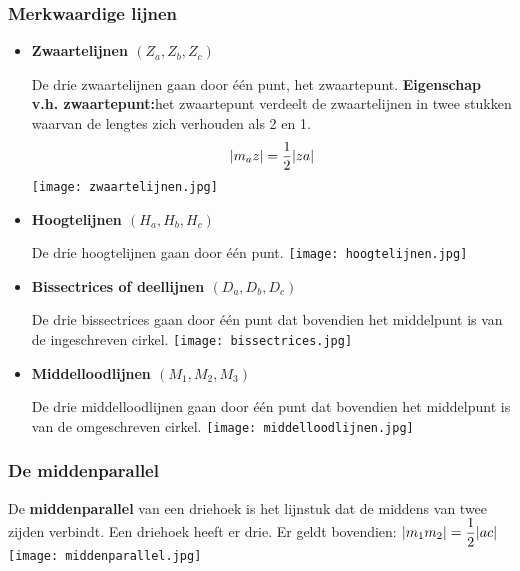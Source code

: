\subsubsection{Merkwaardige lijnen} \label{merkwaardige_lijnen}
\hypertarget{merkwaardige_lijnen}{}
		\begin{itemize}%
		\item \hypertarget{zwaartelijn}{{\bf Zwaartelijnen $(Z_a, Z_b, Z_c)$}}\label{zwaartelijn}\newline
		De drie zwaartelijnen gaan door \'e\'en punt, het zwaartepunt.\newline\newline
		{\bf Eigenschap v.h. zwaartepunt:}het zwaartepunt verdeelt de zwaartelijnen in twee 		stukken waarvan de lengtes zich verhouden als 2 en 1.
		\[|m_az|=\displaystyle\frac{\displaystyle 1}{\displaystyle 2}|za|\]
                \texttt{[image: zwaartelijnen.jpg]}
		\item \hypertarget{hoogtelijn}{{\bf Hoogtelijnen $(H_a, H_b, H_c)$}}\label{hoogtelijn}\newline
		De drie hoogtelijnen gaan door \'e\'en punt.\newline
                \texttt{[image: hoogtelijnen.jpg]}
		\item \hypertarget{bissectrice}{{\bf Bissectrices of deellijnen $(D_a, D_b, D_c)$}}\label{bissectrice}\newline
		De drie bissectrices gaan door \'e\'en punt dat bovendien het middelpunt is van de 		ingeschreven cirkel.\newline
                \texttt{[image: bissectrices.jpg]}
		\item \hypertarget{middelloodlijn}{{\bf Middelloodlijnen $(M_1, M_2, M_3)$}}\label{middelloodlijn}\newline
		De drie middelloodlijnen gaan door \'e\'en punt dat bovendien het middelpunt is van 		de omgeschreven cirkel.\newline
                \texttt{[image: middelloodlijnen.jpg]}
		\end{itemize}%

\subsubsection{De middenparallel} \label{middenparallel}
\hypertarget{middenparallel}{}
		De {\bf middenparallel} van een driehoek is het lijnstuk dat de middens van twee 		zijden verbindt. Een driehoek heeft er drie. Er geldt bovendien: $|m_1m_2| = 		\displaystyle\frac{\displaystyle 1}{\displaystyle 2}|ac|$\newline
                \texttt{[image: middenparallel.jpg]}

